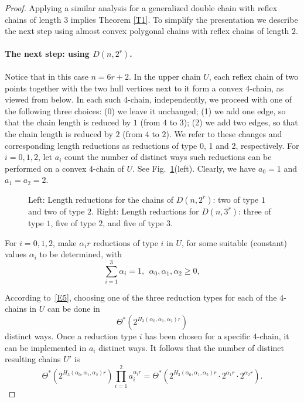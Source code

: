 \documentclass[11pt]{article}
\begin{document}
\begin{proof}
Applying a similar analysis for a generalized double chain with reflex chains of length
$3$ implies Theorem \ref{T1}.
To simplify the presentation we describe the next step
using almost convex polygonal chains with reflex chains of length $2$.
\paragraph{The next step: using $D(n,2^r)$.}
Notice that in this case $n=6r+2$.
In the upper chain $U$, each reflex chain of two points together with the two
hull vertices next to it form a convex $4$-chain, as viewed from below.
In each such $4$-chain, independently, we proceed with one of the
following three choices: (0) we leave it unchanged; (1) we add
one edge, so that the chain length is reduced by $1$ (from $4$ to
$3$); (2) we add two edges, so that the chain length is reduced by $2$
(from $4$ to $2$). We refer to these changes and corresponding length
reductions as reductions of type 0, 1 and 2, respectively.
For $i=0,1,2$, let $a_i$ count the number of distinct ways such
reductions can be performed on a convex $4$-chain of $U$.
See Fig.~\ref{f7}(left). Clearly, we have $a_0=1$ and $a_1=a_2=2$.
\begin{figure}[h]
\centerline{\epsfysize=1.22in }
\caption{Left: Length reductions for the chains of
$D(n,2^r)$: two of type $1$ and two of type $2$.
Right: Length reductions for $D(n,3^r)$: three of type
$1$, five of type $2$, and five of type $3$.}
\label{f7}
\end{figure}

For $i=0,1,2$, make $\alpha_i r$ reductions of type $i$ in $U$,
for some suitable (constant) values $\alpha_i$ to be determined, with
\begin{equation*} \label{E10}
\sum_{i=1}^3 \alpha_i =1, \ \ \alpha_0,\alpha_1,\alpha_2 \geq 0,
\end{equation*}

According to~\eqref{E5}, choosing one of the three reduction types for
each of the $4$-chains in $U$ can be done in
$$ \Theta^*\left(2^{H_3(\alpha_0,\alpha_1,\alpha_2)r}\right) $$
distinct ways. Once a reduction type $i$ has been chosen for a
specific $4$-chain, it can be implemented in $a_i$ distinct ways.
It follows that the number of distinct resulting chains $U'$ is
\begin{equation*} \label{E11}
\Theta^*\left(2^{H_3(\alpha_0,\alpha_1,\alpha_2)r}\right)
\prod_{i=1}^2 a_i^{\alpha_i r} =
\Theta^*\left( 2^{H_3(\alpha_0,\alpha_1,\alpha_2)r} \cdot
2^{\alpha_1 r} \cdot 2^{\alpha_2 r} \right).
\end{equation*}


\end{proof}
\end{document}
